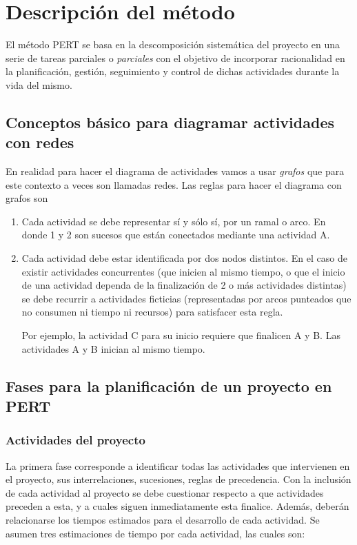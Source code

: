 \documentclass{mylib/reporteCorto}
\begin{document}
\section{Descripción del método}

El método PERT se basa en la descomposición sistemática del proyecto en una serie de tareas parciales o \textit{parciales} con el objetivo de incorporar racionalidad en la planificación, gestión, seguimiento y control de dichas actividades durante la vida del mismo.
\subsection{Conceptos básico para diagramar actividades con redes}

En realidad para hacer el diagrama de actividades vamos a usar \textit{grafos} que para este contexto a veces son llamadas redes. Las reglas para hacer el diagrama con grafos son

\begin{enumerate}
	\item Cada actividad se debe representar sí y sólo sí, por un ramal o arco.
	En donde 1 y 2 son sucesos que están conectados mediante una actividad A.
	\item Cada actividad debe estar identificada por dos nodos distintos. En el caso de existir actividades concurrentes (que inicien al mismo tiempo, o que el inicio de una actividad dependa de la finalización de 2 o más actividades distintas) se debe recurrir a actividades ficticias (representadas por arcos punteados que no consumen ni tiempo ni recursos) para satisfacer esta regla.

	Por ejemplo,  la actividad C para su inicio requiere que finalicen A y B. Las actividades A y B inician al mismo tiempo.

\end{enumerate}

\subsection{Fases para la planificación de un proyecto en PERT}

\subsubsection{Actividades del proyecto}

La primera fase corresponde a identificar todas las actividades que intervienen en el proyecto, sus interrelaciones, sucesiones, reglas de precedencia. Con la inclusión de cada actividad al proyecto se debe cuestionar respecto a que actividades preceden a esta, y a cuales siguen inmediatamente esta finalice. Además, deberán relacionarse los tiempos estimados para el desarrollo de cada actividad.
Se asumen tres estimaciones de tiempo por cada actividad, las cuales son:
\end{document}
